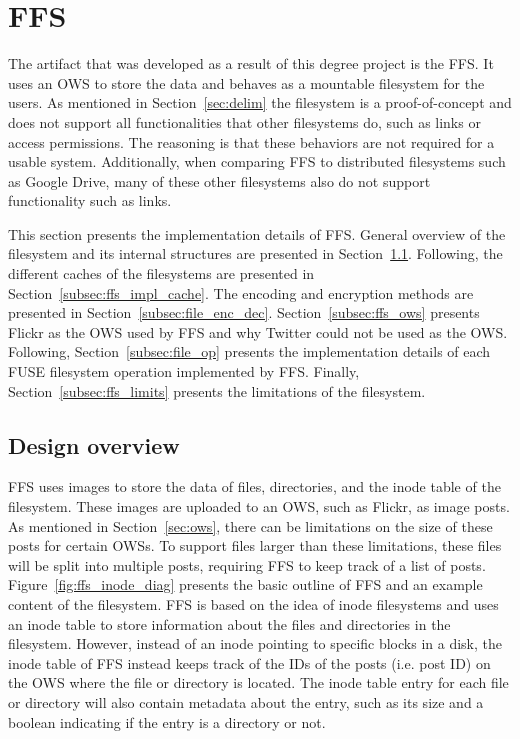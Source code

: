 \section{FFS}
The artifact that was developed as a result of this degree project is the \acrfull{FFS}. It uses an \gls{OWS} to store the data and behaves as a mountable filesystem for the users. As mentioned in Section~\ref{sec:delim} the filesystem is a \mbox{proof-of-concept} and does not support all functionalities that other filesystems do, such as links or access permissions. The reasoning is that these behaviors are not required for a usable system. Additionally, when comparing \gls{FFS} to distributed filesystems such as Google Drive, many of these other filesystems also do not support functionality such as links.

This section presents the implementation details of \gls{FFS}. General overview of the filesystem and its internal structures are presented in Section~\ref{subsec:ffs_impl_overview}. Following, the different caches of the filesystems are presented in Section~\ref{subsec:ffs_impl_cache}. The encoding and encryption methods are presented in Section~\ref{subsec:file_enc_dec}. Section~\ref{subsec:ffs_ows} presents Flickr as the \gls{OWS} used by \gls{FFS} and why Twitter could not be used as the \gls{OWS}. Following, Section~\ref{subsec:file_op} presents the implementation details of each \gls{FUSE} filesystem operation implemented by \gls{FFS}. Finally, Section~\ref{subsec:ffs_limits} presents the limitations of the filesystem.

\subsection{Design overview}
\label{subsec:ffs_impl_overview}
\gls{FFS} uses images to store the data of files, directories, and the inode table of the filesystem. These images are uploaded to an \gls{OWS}, such as Flickr, as image posts. As mentioned in Section~\ref{sec:ows}, there can be limitations on the size of these posts for certain \gls{OWS}s. To support files larger than these limitations, these files will be split into multiple posts, requiring \gls{FFS} to keep track of a list of posts. Figure~\ref{fig:ffs_inode_diag} presents the basic outline of \gls{FFS} and an example content of the filesystem. \gls{FFS} is based on the idea of inode filesystems and uses an inode table to store information about the files and directories in the filesystem. However, instead of an inode pointing to specific blocks in a disk, the inode table of \gls{FFS} instead keeps track of the IDs of the posts (i.e. post ID) on the \gls{OWS} where the file or directory is located. The inode table entry for each file or directory will also contain metadata about the entry, such as its size and a boolean indicating if the entry is a directory or not.

